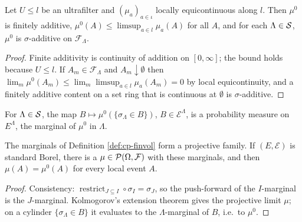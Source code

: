 \begin{lemma}
    \label{lem:cp-sigma-additive}
    \leanok

    Let $U \leq l$ be an ultrafilter and $(\mu_a)_{a \in \iota}$ locally equicontinuous along
    $l$. Then $\mu^0$ is finitely additive, $\mu^0(A) \leq \limsup_{a \in l} \mu_a(A)$ for all
    $A$, and for each $\Lambda \in \mathcal{S}$, $\mu^0$ is $\sigma$-additive on $\mathcal{F}_\Lambda$.
\end{lemma}
\begin{proof}
    \leanok

    Finite additivity is continuity of addition on $[0,\infty]$; the bound holds because
    $U \leq l$. If $A_m \in \mathcal{F}_\Lambda$ and $A_m \downarrow \emptyset$ then
    $\lim_m \mu^0(A_m) \leq \lim_m \limsup_{a \in l} \mu_a(A_m) = 0$ by local equicontinuity,
    and a finitely additive content on a set ring that is continuous at $\emptyset$ is
    $\sigma$-additive.
\end{proof}

\begin{definition}
    \label{def:cp-finvol}
    \leanok

    For $\Lambda \in \mathcal{S}$, the map $B \mapsto \mu^0(\{\sigma_\Lambda \in B\})$,
    $B \in \mathcal{E}^\Lambda$, is a probability measure on $E^\Lambda$, the marginal of
    $\mu^0$ in $\Lambda$.
\end{definition}

\begin{lemma}
    \label{lem:cp-projective}
    \leanok

    The marginals of Definition \ref{def:cp-finvol} form a projective family. If
    $(E, \mathcal{E})$ is standard Borel, there is a $\mu \in \mathcal{P}(\Omega, \mathcal{F})$ with
    these marginals, and then $\mu(A) = \mu^0(A)$ for every local event $A$.
\end{lemma}
\begin{proof}
    \leanok

    Consistency: $\operatorname{restrict}_{J \subseteq I} \circ \sigma_I = \sigma_J$, so the
    push-forward of the $I$-marginal is the $J$-marginal. Kolmogorov's extension theorem gives
    the projective limit $\mu$; on a cylinder $\{\sigma_\Lambda \in B\}$ it evaluates to the
    $\Lambda$-marginal of $B$, i.e.\ to $\mu^0$.
\end{proof}


